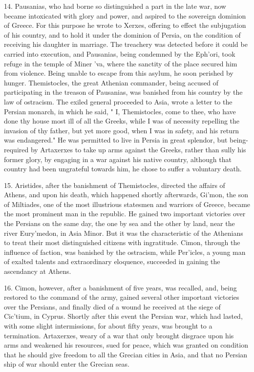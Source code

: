 \documentclass[openany,a4paper]{memoir}
\begin{document}
14. Pausanias, who had borne so distinguished a part in 
the late war, now became intoxicated with glory and power, 
and aspired to the sovereign dominion of Greece. For this 
purpose he wrote to Xerxes, offering to effect the subjugation of his country, and to hold it under the dominion of 
Persia, on the condition of receiving his daughter in marriage. The treachery was detected before it could be carried 
into execution, and Pausanias, being condemned by the 
Eph'ori, took refuge in the temple of Miner 'va, where the 
sanctity of the place secured him from violence. Being unable to escape from this asylum, he soon perished by hunger. 
Themistocles, the great Athenian commander, being accused 
of participating in the treason of Pausanias, was banished 
from his country by the law of ostracism. The exiled general 
proceeded to Asia, wrote a letter to the Persian monarch, in 
which he said, " I, Themistocles, come to thee, who have 
done thy house most ill of all the Greeks, while I was of 
necessity repelling the invasion of thy father, but yet more 
good, when I was in safety, and his return was endangered." 
He was permitted to live in Persia in great splendor, but 
being- required by Artaxerxes to take up arms against the 
Greeks, rather than sully his former glory, by engaging in a 
war against his native country, although that country had been 
ungrateful towards him, he chose to suffer a voluntary death. 

15. Aristides, after the banishment of Themistocles, directed 
the affairs of Athens, and upon his death, which happened 
shortly afterwards, Gi'mon, the son of Miltiades, one of the 
most illustrious statesmen and warriors of Greece, became 
the most prominent man in the republic. He gained two 
important victories over the Persians on the same day, the 
one by sea and the other by land, near the river Eury'medon, 
in Asia Minor. But it was the characteristic of the Athenians to treat their most distinguished citizens with ingratitude. Cimon, through the influence of faction, was banished 
by the ostracism, while Per'icles, a young man of exalted 
talents and extraordinary eloquence, succeeded in gaining the 
ascendancy at Athens. 

16. Cimon, however, after a banishment of five years, was 
recalled, and, being restored to the command of the army, 
gained several other important victories over the Persians, 
and finally died of a wound he received at the siege of Cic'tium, in Cyprus. Shortly after this event the Persian war, 
which had lasted, with some slight intermissions, for about 
fifty years, was brought to a termination. Artaxerxes, weary 
of a war that only brought disgrace upon his arms and 
weakened his resources, sued for peace, which was granted 
on condition that he should give freedom to all the Grecian 
cities in Asia, and that no Persian ship of war should enter 
the Grecian seas. 
\end{document}
